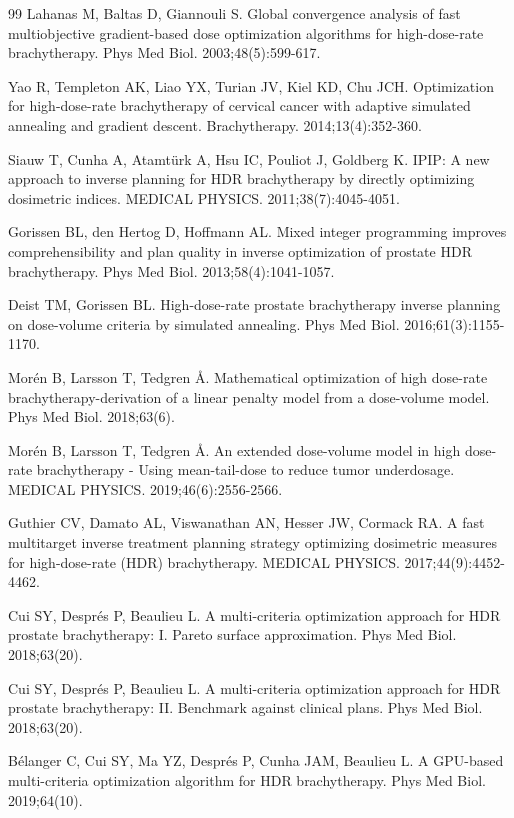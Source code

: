\documentclass[12pt,twoside,letterpaper]{article}
\newcounter{algorithm}
\begin{document}
\begin{thebibliography}{99}
 Lahanas M, Baltas D, Giannouli S. Global convergence analysis of fast multiobjective gradient-based dose optimization algorithms for high-dose-rate brachytherapy. Phys Med Biol. 2003;48(5):599-617.

 Yao R, Templeton AK, Liao YX, Turian JV, Kiel KD, Chu JCH. Optimization for high-dose-rate brachytherapy of cervical cancer with adaptive simulated annealing and gradient descent. Brachytherapy. 2014;13(4):352-360.

 Siauw T, Cunha A, Atamtürk A, Hsu IC, Pouliot J, Goldberg K. IPIP: A new approach to inverse planning for HDR brachytherapy by directly optimizing dosimetric indices. MEDICAL PHYSICS. 2011;38(7):4045-4051.

 Gorissen BL, den Hertog D, Hoffmann AL. Mixed integer programming improves comprehensibility and plan quality in inverse optimization of prostate HDR brachytherapy. Phys Med Biol. 2013;58(4):1041-1057.

 Deist TM, Gorissen BL. High-dose-rate prostate brachytherapy inverse planning on dose-volume criteria by simulated annealing. Phys Med Biol. 2016;61(3):1155-1170.

 Morén B, Larsson T, Tedgren Å. Mathematical optimization of high dose-rate brachytherapy-derivation of a linear penalty model from a dose-volume model. Phys Med Biol. 2018;63(6).

 Morén B, Larsson T, Tedgren Å. An extended dose-volume model in high dose-rate brachytherapy - Using mean-tail-dose to reduce tumor underdosage. MEDICAL PHYSICS. 2019;46(6):2556-2566.

 Guthier CV, Damato AL, Viswanathan AN, Hesser JW, Cormack RA. A fast multitarget inverse treatment planning strategy optimizing dosimetric measures for high-dose-rate (HDR) brachytherapy. MEDICAL PHYSICS. 2017;44(9):4452-4462.

 Cui SY, Després P, Beaulieu L. A multi-criteria optimization approach for HDR prostate brachytherapy: I. Pareto surface approximation. Phys Med Biol. 2018;63(20).

 Cui SY, Després P, Beaulieu L. A multi-criteria optimization approach for HDR prostate brachytherapy: II. Benchmark against clinical plans. Phys Med Biol. 2018;63(20).

 Bélanger C, Cui SY, Ma YZ, Després P, Cunha JAM, Beaulieu L. A GPU-based multi-criteria optimization algorithm for HDR brachytherapy. Phys Med Biol. 2019;64(10).


\end{thebibliography}
\end{document}
